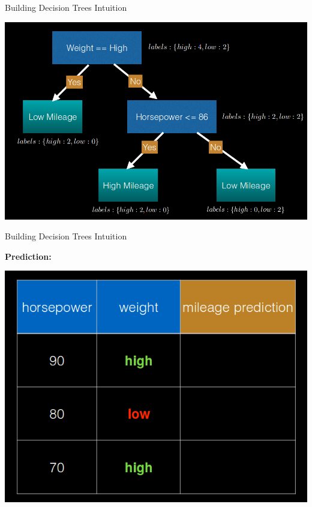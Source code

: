 \documentclass{beamer}
\begin{document}
\begin{frame}{Building Decision Trees Intuition}
    \begin{center}
        \includegraphics[scale=0.3]{dTreeEg3.png}
    \end{center}
\end{frame}
\begin{frame}{Building Decision Trees Intuition}

    {\bf Prediction:}
    \begin{center}
        \includegraphics[scale=0.3]{dTreeEg4.png}
    \end{center}
\end{frame}
\end{document}
